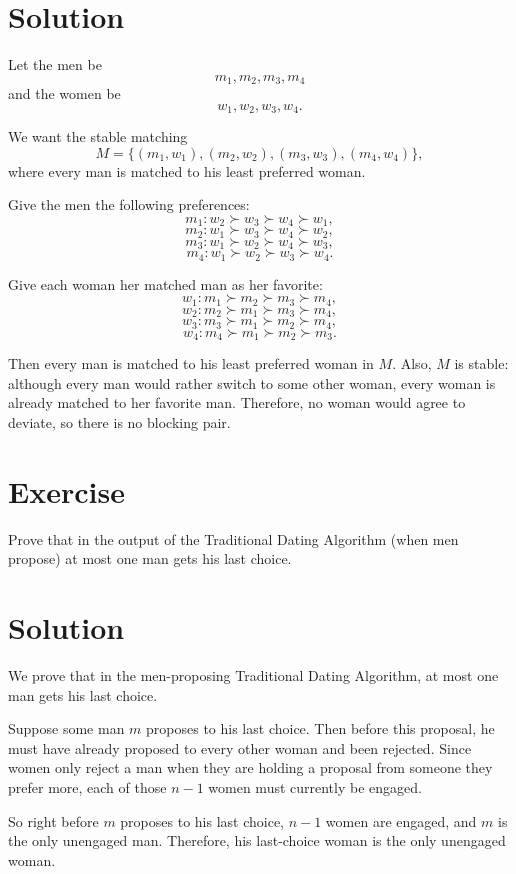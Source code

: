 \documentclass[14pt]{extreport}
\newcounter{counter}
\newcommand{\Exercise}{Exercise \stepcounter{counter}\thecounter}
\begin{document}
\section*{Solution}
    Let the men be
    $$m_1, m_2, m_3, m_4$$
    and the women be
    $$w_1, w_2, w_3, w_4.$$

    We want the stable matching
    $$M = \{(m_1,w_1), (m_2,w_2), (m_3,w_3), (m_4,w_4)\},$$
    where every man is matched to his least preferred woman.

    Give the men the following preferences:
    $$m_1: w_2 \succ w_3 \succ w_4 \succ w_1,$$
    $$m_2: w_1 \succ w_3 \succ w_4 \succ w_2,$$
    $$m_3: w_1 \succ w_2 \succ w_4 \succ w_3,$$
    $$m_4: w_1 \succ w_2 \succ w_3 \succ w_4.$$

    Give each woman her matched man as her favorite:
    $$w_1: m_1 \succ m_2 \succ m_3 \succ m_4,$$
    $$w_2: m_2 \succ m_1 \succ m_3 \succ m_4,$$
    $$w_3: m_3 \succ m_1 \succ m_2 \succ m_4,$$
    $$w_4: m_4 \succ m_1 \succ m_2 \succ m_3.$$

    Then every man is matched to his least preferred woman in $M$. Also, $M$ is stable: although every man would rather switch to some other woman, every woman is already matched to her favorite man. Therefore, no woman would agree to deviate, so there is no blocking pair.

\section*{\Exercise}
    Prove that in the output of the Traditional Dating Algorithm (when men propose) at most one man gets his last choice.

\section*{Solution}
    We prove that in the men-proposing Traditional Dating Algorithm, at most one man gets his last choice.

    \vspace{3mm}
    Suppose some man $m$ proposes to his last choice. Then before this proposal, he must have already proposed to every other woman and been rejected. Since women only reject a man when they are holding a proposal from someone they prefer more, each of those $n - 1$ women must currently be engaged.

    \vspace{3mm}
    So right before $m$ proposes to his last choice, $n - 1$ women are engaged, and $m$ is the only unengaged man. Therefore, his last-choice woman is the only unengaged woman.
\end{document}
